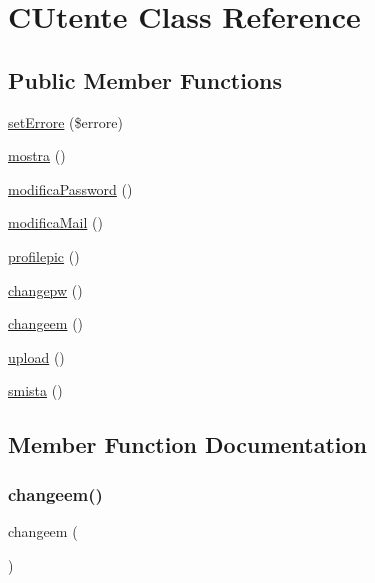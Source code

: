 \hypertarget{class_c_utente}{}\section{C\+Utente Class Reference}
\label{class_c_utente}
\subsection*{Public Member Functions}
\begin{DoxyCompactItemize}
\item 
\mbox{\hyperlink{class_c_utente_a9c4c3362aa5a2db624792c7cf90711e2}{set\+Errore}} (\$errore)
\item 
\mbox{\hyperlink{class_c_utente_a67a2a3bf6a01618020c3dcb546b9f5d8}{mostra}} ()
\item 
\mbox{\hyperlink{class_c_utente_af3fc2d0291f11cc62479a15fa6167266}{modifica\+Password}} ()
\item 
\mbox{\hyperlink{class_c_utente_a7090c2a3eb07813b3a5c163bf470f2fe}{modifica\+Mail}} ()
\item 
\mbox{\hyperlink{class_c_utente_a435511048d4049456f0c24c988a9c628}{profilepic}} ()
\item 
\mbox{\hyperlink{class_c_utente_a8b06e08492800ad20e31dc9066cf0839}{changepw}} ()
\item 
\mbox{\hyperlink{class_c_utente_a261e4d68ece246b596a0386596888d5a}{changeem}} ()
\item 
\mbox{\hyperlink{class_c_utente_a160ae63d11b56d3190b172facb43a343}{upload}} ()
\item 
\mbox{\hyperlink{class_c_utente_afc7ba180569cef3535974cfc4a1211f1}{smista}} ()
\end{DoxyCompactItemize}


\subsection{Member Function Documentation}
\mbox{\label{class_c_utente_a261e4d68ece246b596a0386596888d5a}} 
\subsubsection{\texorpdfstring{changeem()}{changeem()}}
{\footnotesize\ttfamily changeem (\begin{DoxyParamCaption}{ }\end{DoxyParamCaption})}

